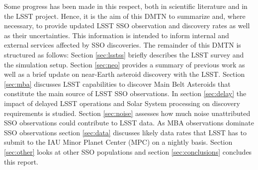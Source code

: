 Some progress has been made in this respect, both in scientific literature and in the \gls{LSST} project. Hence, it is the aim of this \gls{DMTN} to summarize and, where necessary, to provide updated \gls{LSST} \gls{SSO} observation and discovery rates as well as their uncertainties. This information is intended to inform internal and external services affected by \gls{SSO} discoveries.
The remainder of this \gls{DMTN} is structured as follows: Section \ref{sec:lsstss} briefly describes the \gls{LSST} survey and the simulation setup. Section \ref{sec:neo} provides a summary of previous work as well as a brief update on near-Earth asteroid discovery with the \gls{LSST}. Section \ref{sec:mba} discusses \gls{LSST} capabilities to discover Main Belt Asteroids that constitute the main source of \gls{LSST} \gls{SSO} observations. In section \ref{sec:delay} the impact of delayed \gls{LSST} operations and Solar System processing on discovery requirements is studied. Section \ref{sec:noise} assesses how much noise unattributed \gls{SSO} observations could contribute to \gls{LSST} data. As \gls{MBA} observations dominate \gls{SSO} observations section \ref{sec:data} discusses likely data rates that \gls{LSST} has to submit to the \gls{IAU} Minor Planet \gls{Center} (\gls{MPC}) on a nightly basis. Section \ref{sec:other}  looks at other \gls{SSO} populations and section \ref{sec:conclusions} concludes this report.

